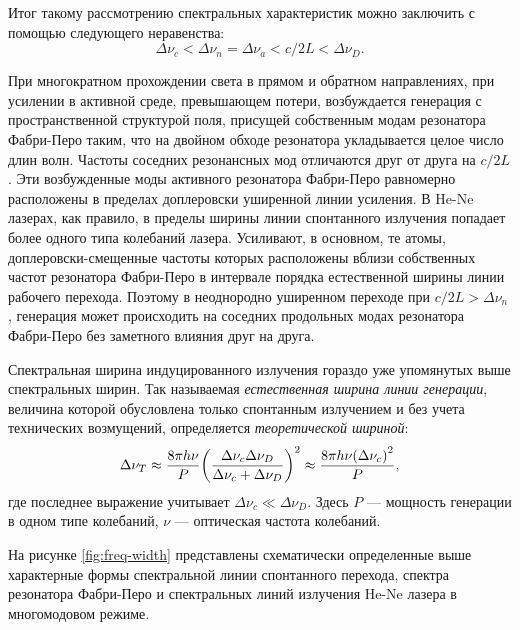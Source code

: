 \documentclass[12pt, russian, a4paper]{article}
\begin{document}
	Итог такому рассмотрению спектральных характеристик можно заключить с помощью следующего неравенства:
	\begin{equation}
		\Delta \nu_c < \Delta \nu_n = \Delta \nu_a < c/2L < \Delta \nu_D.
	\end{equation}

	При многократном прохождении света в прямом и обратном направлениях, при усилении в активной среде, превышающем потери, возбуждается генерация с пространственной структурой поля, присущей собственным модам резонатора Фабри-Перо таким, что на двойном обходе резонатора укладывается целое число длин волн. Частоты соседних резонансных мод отличаются друг от друга на $c/2L$. Эти возбужденные моды активного резонатора Фабри-Перо равномерно расположены в пределах доплеровски уширенной линии усиления. В He-Ne лазерах, как правило, в пределы ширины линии спонтанного излучения попадает более одного типа колебаний лазера. Усиливают, в основном, те атомы, доплеровски-смещенные частоты которых расположены вблизи собственных частот резонатора Фабри-Перо в интервале порядка естественной ширины линии рабочего перехода. Поэтому в неоднородно уширенном переходе при $c/2L > \Delta\nu_n$, генерация может происходить на соседних продольных модах резонатора Фабри-Перо без заметного влияния друг на друга.

	Спектральная ширина индуцированного излучения гораздо уже упомянутых выше спектральных ширин. Так называемая \emph{естественная ширина линии генерации}, величина которой обусловлена только спонтанным излучением и без учета технических возмущений, определяется \emph{теоретической шириной}:
	\begin{equation}
		\Delta\nu_T \approx \dfrac{8\pi h \nu}{P}\qty(\dfrac{\Delta\nu_c \Delta\nu_D}{\Delta\nu_c + \Delta\nu_D})^2 \approx \dfrac{8\pi h \nu \qty(\Delta \nu_c)^2}{P},
	\end{equation}
	где последнее выражение учитывает $\Delta\nu_c \ll \Delta\nu_D$. Здесь $P$ --- мощность генерации в одном типе колебаний, $\nu$ --- оптическая частота колебаний.

	На рисунке \ref{fig:freq-width} представлены схематически определенные выше характерные формы спектральной линии спонтанного перехода, спектра резонатора Фабри-Перо и спектральных линий излучения He-Ne лазера в многомодовом режиме.
\end{document}
